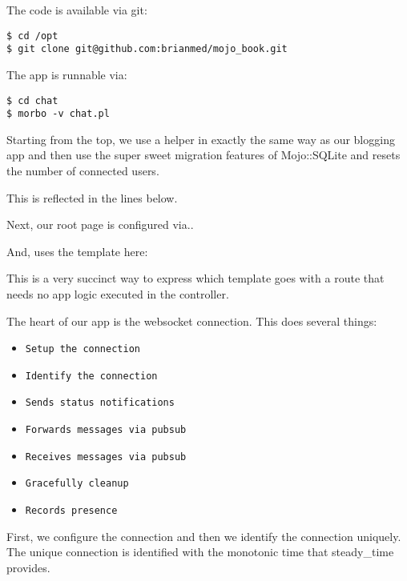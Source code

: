 \documentclass[14pt]{extreport}
\newcommand\Small{\fontsize{12}{13.0}\fontencoding{T1}\selectfont}
\newcommand*\LSTfont{\Small\ttfamily\SetTracking{encoding=*}{-60}\lsstyle}
\begin{document}
The code is available via git:

\begin{lstlisting}[style=BashOutputStyle]
$ cd /opt
$ git clone git@github.com:brianmed/mojo_book.git
\end{lstlisting}

The app is runnable via:

\begin{lstlisting}[style=BashInputStyle]
$ cd chat
$ morbo -v chat.pl
\end{lstlisting}

Starting from the top, we use a helper in exactly the same way as our blogging
app and then use the super sweet migration features of Mojo::SQLite and resets the
number of connected users.

This is reflected in the lines below.



Next, our root page is configured via..



And, uses the template here:



This is a very succinct way to express which template goes with a route that
needs no app logic executed in the controller.

The heart of our app is the websocket connection.  This does several things:

\begin{itemize} \itemsep1pt \parskip0pt 
\item \verb|Setup the connection|
\item \verb|Identify the connection|
\item \verb|Sends status notifications|
\item \verb|Forwards messages via pubsub|
\item \verb|Receives messages via pubsub|
\item \verb|Gracefully cleanup|
\item \verb|Records presence|
\end{itemize}

First, we configure the connection and then we identify the connection
uniquely.  The unique connection is identified with the monotonic time that
steady\_time provides.
\end{document}
